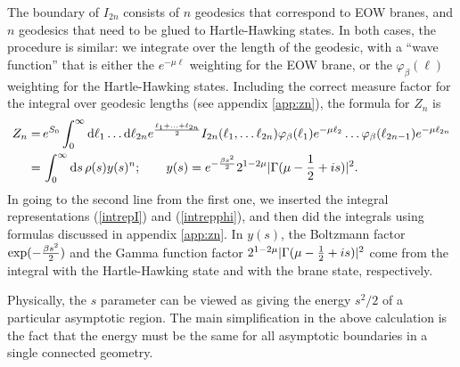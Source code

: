 \documentclass[11pt]{article}
\newcommand{\be}{\begin{equation}}
\newcommand{\ee}{\end{equation}}
\numberwithin{equation}{section}
\begin{document}
The boundary of $I_{2n}$ consists of $n$ geodesics that correspond to EOW branes, and $n$ geodesics that need to be glued to Hartle-Hawking states. In both cases, the procedure is similar: we integrate over the length of the geodesic, with a ``wave function'' that is either the $e^{-\mu\ell}$ weighting for the EOW brane, or the $\varphi_\beta(\ell)$ weighting for the Hartle-Hawking states. Including the correct measure factor for the integral over geodesic lengths (see appendix \ref{app:zn}), the formula for $Z_n$ is
\be
\begin{split}
	Z_n=\,&e^{S_0}\int_0^\infty \mathrm{d}\ell_1 \dots\mathrm{d}\ell_{2n}e^{\ell_{1}+...+\ell_{2n}\over 2} I_{2n}(\ell_1,\dots\ell_{2n})\varphi_{\beta}(\ell_{1})e^{-\mu\ell_2}\dots\varphi_{\beta}(\ell_{2n-1})e^{-\mu \ell_{2n}}\\
	=\,&\int_0^\infty \mathrm{d}s\, \rho(s) y(s)^n;\hspace{20pt} y(s)=e^{-{\beta s^2\over 2}}2^{1-2\mu}|\Gamma(\mu-{1\over 2}+is)|^2.\label{finalZn}
\end{split}
\ee
In going to the second line from the first one, we inserted the integral representations (\ref{intrepI}) and (\ref{intrepphi}), and then did the integrals using formulas discussed in appendix \ref{app:zn}. In $y(s)$, the Boltzmann factor $\exp(-{\beta s^2\over 2})$ and the Gamma function factor $2^{1-2\mu}|\Gamma(\mu-{1\over 2}+is)|^2$ come from the integral with the Hartle-Hawking state and with the brane state, respectively.

Physically, the $s$ parameter can be viewed as giving the energy $s^2/2$ of a particular asymptotic region. The main simplification in the above calculation is the fact that the energy must be the same for all asymptotic boundaries in a single connected geometry.

\end{document}
